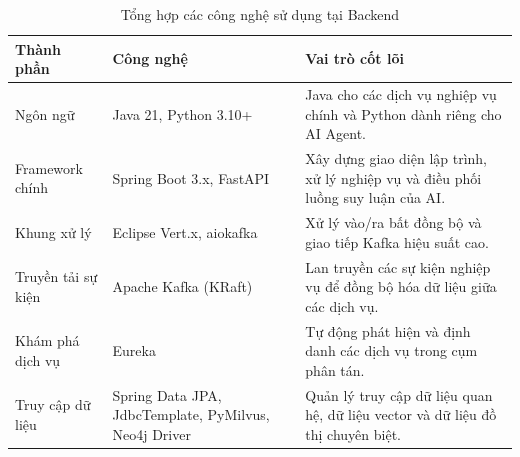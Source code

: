 \begin{table}[H]
\centering
\caption{Tổng hợp các công nghệ sử dụng tại Backend}
\label{tab:backend_tech}
\begin{tabular}{|l|p{4.5cm}|p{6cm}|}
\hline
\textbf{Thành phần} & \textbf{Công nghệ} & \textbf{Vai trò cốt lõi} \\ \hline
Ngôn ngữ & Java 21, Python 3.10+ & Java cho các dịch vụ nghiệp vụ chính và Python dành riêng cho AI Agent. \\ \hline
Framework chính & Spring Boot 3.x, FastAPI& Xây dựng giao diện lập trình, xử lý nghiệp vụ và điều phối luồng suy luận của AI. \\ \hline
Khung xử lý & Eclipse Vert.x, aiokafka & Xử lý vào/ra bất đồng bộ và giao tiếp Kafka hiệu suất cao. \\ \hline
Truyền tải sự kiện & Apache Kafka (KRaft) & Lan truyền các sự kiện nghiệp vụ để đồng bộ hóa dữ liệu giữa các dịch vụ. \\ \hline
Khám phá dịch vụ & Eureka & Tự động phát hiện và định danh các dịch vụ trong cụm phân tán. \\ \hline
Truy cập dữ liệu & Spring Data JPA, JdbcTemplate, PyMilvus, Neo4j Driver & Quản lý truy cập dữ liệu quan hệ, dữ liệu vector và dữ liệu đồ thị chuyên biệt. \\ \hline
\end{tabular}
\end{table}




